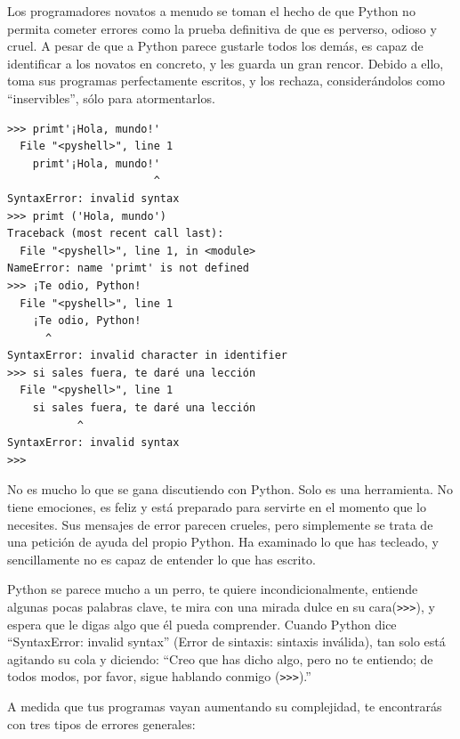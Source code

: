 Los programadores novatos a menudo se toman el hecho de que Python no
permita cometer errores como la prueba definitiva de que es perverso,
odioso y cruel. A pesar de que a Python parece gustarle todos los demás,
es capaz de identificar a los novatos en concreto, y les guarda un gran
rencor. Debido a ello, toma sus programas perfectamente escritos, y los
rechaza, considerándolos como ``inservibles'', sólo para atormentarlos.

\begin{Verbatim}[frame=single]
>>> primt'¡Hola, mundo!'
  File "<pyshell>", line 1
    primt'¡Hola, mundo!'
                       ^
SyntaxError: invalid syntax
>>> primt ('Hola, mundo')
Traceback (most recent call last):
  File "<pyshell>", line 1, in <module>
NameError: name 'primt' is not defined
>>> ¡Te odio, Python!
  File "<pyshell>", line 1
    ¡Te odio, Python!
      ^
SyntaxError: invalid character in identifier
>>> si sales fuera, te daré una lección
  File "<pyshell>", line 1
    si sales fuera, te daré una lección
           ^
SyntaxError: invalid syntax
>>> 
\end{Verbatim}

No es mucho lo que se gana discutiendo con Python. Solo es una
herramienta. No tiene emociones, es feliz y está preparado para servirte
en el momento que lo necesites. Sus mensajes de error parecen crueles,
pero simplemente se trata de una petición de ayuda del propio Python. Ha
examinado lo que has tecleado, y sencillamente no es capaz de entender
lo que has escrito.

Python se parece mucho a un perro, te quiere incondicionalmente,
entiende algunas pocas palabras clave, te mira con una mirada dulce en
su cara(\texttt{\textgreater{}\textgreater{}\textgreater{}}), y espera
que le digas algo que él pueda comprender. Cuando Python dice
``SyntaxError: invalid syntax'' (Error de sintaxis: sintaxis inválida),
tan solo está agitando su cola y diciendo: ``Creo que has dicho algo,
pero no te entiendo; de todos modos, por favor, sigue hablando conmigo
(\texttt{\textgreater{}\textgreater{}\textgreater{}}).''

A medida que tus programas vayan aumentando su complejidad, te
encontrarás con tres tipos de errores generales:

